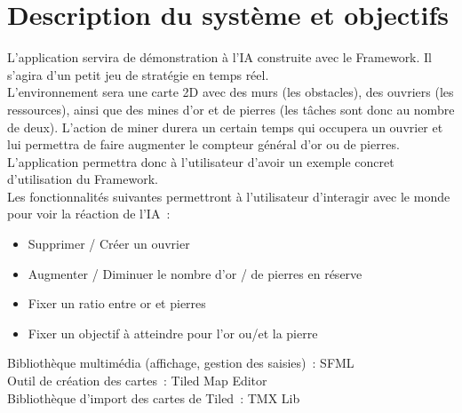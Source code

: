 \section{Description du système et objectifs}

L'application servira de démonstration à l'IA construite avec le Framework. Il s'agira d'un petit jeu de stratégie en temps réel.\\

L'environnement sera une carte 2D avec des murs (les obstacles), des ouvriers (les ressources), ainsi que des mines d'or et de pierres (les tâches sont donc au nombre de deux). L'action de miner durera un certain temps qui occupera un ouvrier et lui permettra de faire augmenter le compteur général d'or ou de pierres.\\

L'application permettra donc à l'utilisateur d'avoir un exemple concret d'utilisation du Framework.\\

Les fonctionnalités suivantes permettront à l'utilisateur d'interagir avec le monde pour voir la réaction de l'IA~:
\begin{itemize}
\item Supprimer / Créer un ouvrier
\item Augmenter / Diminuer le nombre d'or / de pierres en réserve
\item Fixer un ratio entre or et pierres
\item Fixer un objectif à atteindre pour l'or ou/et la pierre
\end{itemize} \vspace{4mm}

\noindent Bibliothèque multimédia (affichage, gestion des saisies)~: SFML\\
Outil de création des cartes~: Tiled Map Editor\\
Bibliothèque d'import des cartes de Tiled~: TMX Lib
